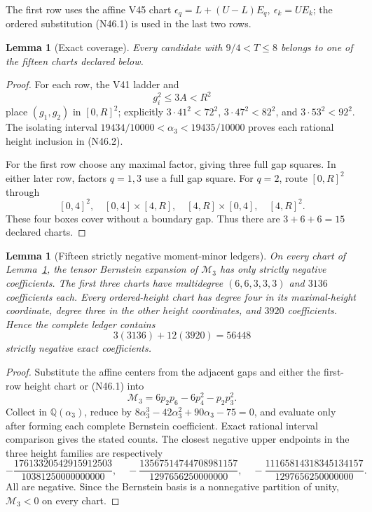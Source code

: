 \documentclass[11pt]{article}
\newtheorem{lemma}[theorem]{Lemma}
\theoremstyle{definition}
\theoremstyle{remark}
\begin{document}
The first row uses the affine V45 chart
\(\epsilon_q=L+(U-L)E_q,\ \epsilon_k=UE_k\); the ordered substitution
\textup{(N46.1)} is used in the last two rows.

\begin{lemma}[Exact coverage]
\label{lem:f2v46-cover}
Every candidate with \(9/4<T\leq8\) belongs to one of the fifteen charts
declared below.
\end{lemma}

\begin{proof}
For each row, the V41 ladder and
\[
 g_i^2\leq3A<R^2
\tag{N46.3}
\]
place \((g_1,g_2)\) in \([0,R]^2\); explicitly
\(3\cdot41^2<72^2\), \(3\cdot47^2<82^2\), and
\(3\cdot53^2<92^2\).  The isolating interval
\(19434/10000<\alpha_3<19435/10000\) proves each rational height
inclusion in \textup{(N46.2)}.

For the first row choose any maximal factor, giving three full gap
squares.  In either later row, factors \(q=1,3\) use a full gap square.
For \(q=2\), route \([0,R]^2\) through
\[
 [0,4]^2,\quad [0,4]\times[4,R],\quad
 [4,R]\times[0,4],\quad[4,R]^2.
\tag{N46.4}
\]
These four boxes cover without a boundary gap.  Thus there are
\(3+6+6=15\) declared charts.
\end{proof}

\begin{lemma}[Fifteen strictly negative moment-minor ledgers]
\label{lem:f2v46-ledgers}
On every chart of Lemma~\ref{lem:f2v46-cover}, the tensor Bernstein
expansion of \(\mathcal M_3\) has only strictly negative coefficients.
The first three charts have multidegree \((6,6,3,3,3)\) and \(3136\)
coefficients each.  Every ordered-height chart has degree four in its
maximal-height coordinate, degree three in the other height coordinates,
and \(3920\) coefficients.  Hence the complete ledger contains
\[
 3(3136)+12(3920)=56448
\tag{N46.5}
\]
strictly negative exact coefficients.
\end{lemma}

\begin{proof}
Substitute the affine centers from the adjacent gaps and either the
first-row height chart or \textup{(N46.1)} into
\[
 \mathcal M_3=6p_2p_6-6p_4^2-p_2p_3^2.
\tag{N46.6}
\]
Collect in \(\mathbb Q(\alpha_3)\), reduce by
\(8\alpha_3^3-42\alpha_3^2+90\alpha_3-75=0\), and evaluate only after
forming each complete Bernstein coefficient.  Exact rational interval
comparison gives the stated counts.  The closest negative upper
endpoints in the three height families are respectively
\[
 -\frac{17613320542915912503}{10381250000000000},\quad
 -\frac{13567514744708981157}{1297656250000000},\quad
 -\frac{11165814318345134157}{1297656250000000}.
\tag{N46.7}
\]
All are negative.  Since the Bernstein basis is a nonnegative partition
of unity, \(\mathcal M_3<0\) on every chart.
\end{proof}
\end{document}
